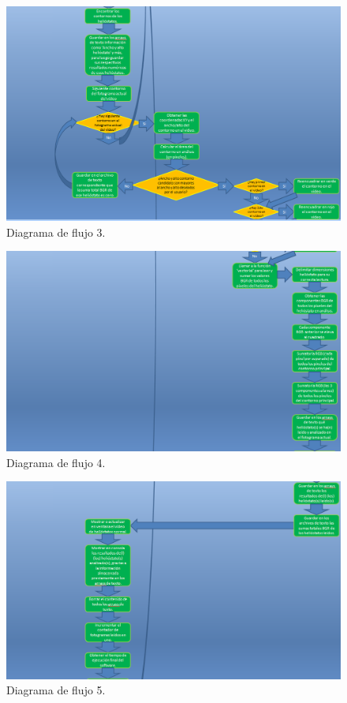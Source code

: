 \begin{figure}[h!]
  	\centering
	\includegraphics[width=\textwidth]{DiagramaFlujoSoftwareTFG/diagramaFlujo3.PNG}
	\caption{Diagrama de flujo 3.
	\label{fig:DiagramaFlujoSoftwareTFG/diagramaFlujo3.PNG}}
\end{figure}

\begin{figure}[h!]
  	\centering
	\includegraphics[width=\textwidth]{DiagramaFlujoSoftwareTFG/diagramaFlujo4.PNG}
	\caption{Diagrama de flujo 4.
	\label{fig:DiagramaFlujoSoftwareTFG/diagramaFlujo4.PNG}}
\end{figure}

\begin{figure}[h!]
  	\centering
	\includegraphics[width=\textwidth]{DiagramaFlujoSoftwareTFG/diagramaFlujo5.PNG}
	\caption{Diagrama de flujo 5.
	\label{fig:DiagramaFlujoSoftwareTFG/diagramaFlujo5.PNG}}
\end{figure}

